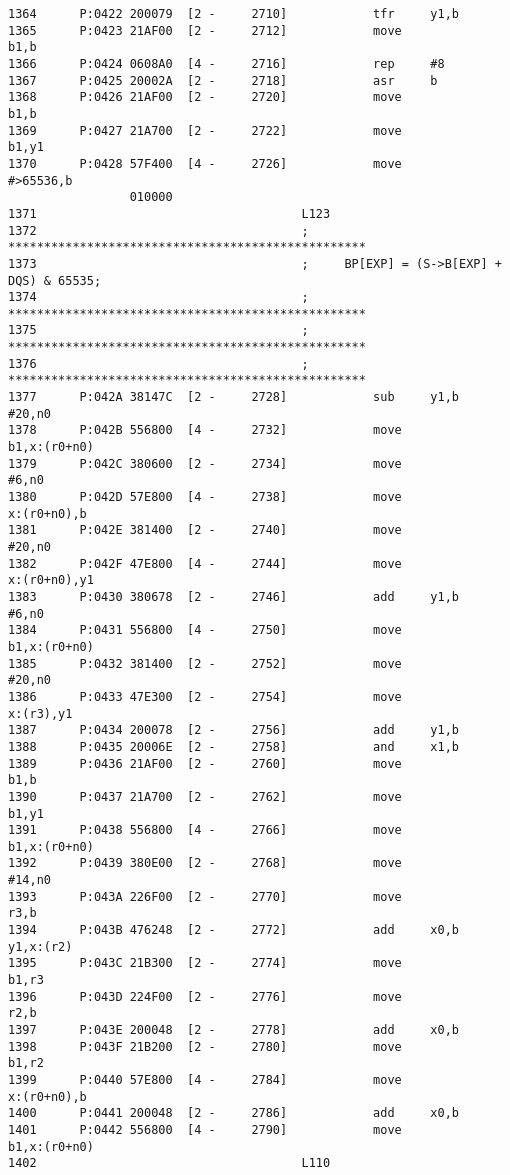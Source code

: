 {\begin{verbatim}
1364      P:0422 200079  [2 -     2710]            tfr     y1,b
1365      P:0423 21AF00  [2 -     2712]            move              b1,b
1366      P:0424 0608A0  [4 -     2716]            rep     #8
1367      P:0425 20002A  [2 -     2718]            asr     b
1368      P:0426 21AF00  [2 -     2720]            move              b1,b
1369      P:0427 21A700  [2 -     2722]            move              b1,y1
1370      P:0428 57F400  [4 -     2726]            move              #>65536,b
                 010000
1371                                     L123
1372                                     ; **************************************************
1373                                     ;     BP[EXP] = (S->B[EXP] + DQS) & 65535;
1374                                     ; **************************************************
1375                                     ; **************************************************
1376                                     ; **************************************************
1377      P:042A 38147C  [2 -     2728]            sub     y1,b      #20,n0
1378      P:042B 556800  [4 -     2732]            move              b1,x:(r0+n0)
1379      P:042C 380600  [2 -     2734]            move              #6,n0
1380      P:042D 57E800  [4 -     2738]            move              x:(r0+n0),b
1381      P:042E 381400  [2 -     2740]            move              #20,n0
1382      P:042F 47E800  [4 -     2744]            move              x:(r0+n0),y1
1383      P:0430 380678  [2 -     2746]            add     y1,b      #6,n0
1384      P:0431 556800  [4 -     2750]            move              b1,x:(r0+n0)
1385      P:0432 381400  [2 -     2752]            move              #20,n0
1386      P:0433 47E300  [2 -     2754]            move              x:(r3),y1
1387      P:0434 200078  [2 -     2756]            add     y1,b
1388      P:0435 20006E  [2 -     2758]            and     x1,b
1389      P:0436 21AF00  [2 -     2760]            move              b1,b
1390      P:0437 21A700  [2 -     2762]            move              b1,y1
1391      P:0438 556800  [4 -     2766]            move              b1,x:(r0+n0)
1392      P:0439 380E00  [2 -     2768]            move              #14,n0
1393      P:043A 226F00  [2 -     2770]            move              r3,b
1394      P:043B 476248  [2 -     2772]            add     x0,b      y1,x:(r2)
1395      P:043C 21B300  [2 -     2774]            move              b1,r3
1396      P:043D 224F00  [2 -     2776]            move              r2,b
1397      P:043E 200048  [2 -     2778]            add     x0,b
1398      P:043F 21B200  [2 -     2780]            move              b1,r2
1399      P:0440 57E800  [4 -     2784]            move              x:(r0+n0),b
1400      P:0441 200048  [2 -     2786]            add     x0,b
1401      P:0442 556800  [4 -     2790]            move              b1,x:(r0+n0)
1402                                     L110
\end{verbatim}
}
\newpage

